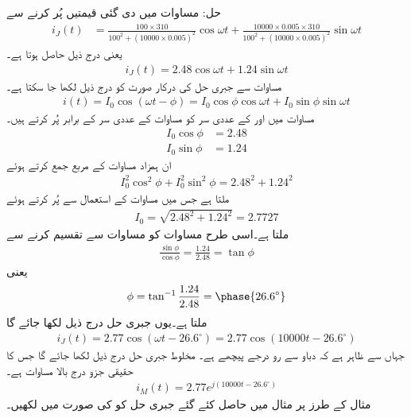 حل: مساوات  میں دی گئی قیمتیں پُر کرنے سے
\begin{align*}
i_J(t)&=\frac{100\times 310}{100^2+(\num{10000}\times 0.005)^2} \cos \omega t+\frac{\num{10000}\times 0.005\times 310}{100^2+(\num{10000}\times 0.005)^2} \sin \omega t
\end{align*}
یعنی درج ذیل حاصل ہوتا ہے۔
\begin{align}\label{مساوات_بدلتا_جبری_حل_ب}
i_J(t)=2.48\cos \omega t+1.24\sin \omega t
\end{align}
مساوات  سے  جبری حل کی درکار صورت کو درج ذیل لکھا جا سکتا ہے۔ 
\begin{align}\label{مساوات_بدلتا_جبری_حل_پ}
i(t)=I_0 \cos(\omega t-\phi)=I_0 \cos \phi \cos \omega t+I_0 \sin \phi \sin \omega t
\end{align}
مساوات  میں  اور  کے عددی سر کو مساوات  کے عددی سر کے برابر پُر کرتے ہیں۔
\begin{align}
I_0 \cos \phi &=2.48 \label{مساوات_بدلتا_جبری_حل_ت}\\
I_0 \sin \phi&=1.24 \label{مساوات_بدلتا_جبری_حل_ٹ}
\end{align}
ان ہمزاد مساوات کے مربع جمع کرتے ہوئے 
\begin{align*}
I_0^2 \cos^2 \phi+I_0^2 \sin^2 \phi=2.48^2+1.24^2
\end{align*}
ملتا ہے جس میں مساوات  کے استعمال سے   پُر کرتے ہوئے
\begin{align*}
I_0=\sqrt{2.48^2+1.24^2}=2.7727
\end{align*}
ملتا ہے۔اسی طرح مساوات  کو مساوات  سے تقسیم کرنے سے
\begin{align*}
\frac{\sin \phi}{\cos \phi}=\frac{1.24}{2.48}=\tan \phi
\end{align*}
یعنی
\begin{align*}
\phi=\tan ^{-1}\frac{1.24}{2.48}=\phase{26.6^{\circ}}
\end{align*}
ملتا ہے۔یوں جبری حل درج ذیل لکھا جائے گا
\begin{align}
i_J(t)=2.77\cos(\omega t-26.6^{\circ})=2.77\cos(\num{10000} t-26.6^{\circ})
\end{align}
جہاں سے ظاہر ہے کہ دباو سے رو  درجے پیچھے ہے۔ مخلوط جبری حل درج ذیل لکھا جائے گا جس کا حقیقی جزو درج بالا مساوات ہے۔
\begin{align}\label{مساوات_بدلتا_مخلوط_رو_صورت}
i_M(t)=2.77 e^{j(\num{10000} t-26.6^{\circ})}
\end{align}
مثال  کے طرز پر مثال  میں حاصل کئے گئے جبری حل کو  کی صورت میں لکھیں۔

